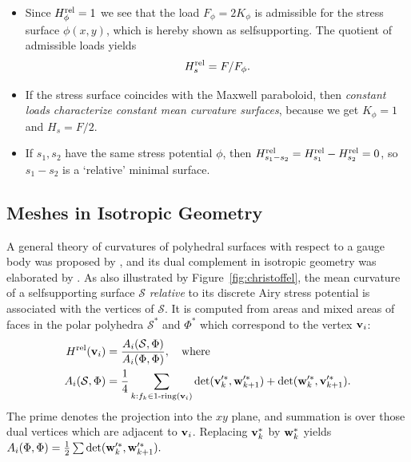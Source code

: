 \documentclass[annual]{acmsiggraph}
\def\rel{{\mathord{\text{\rm rel}}}}
\def\SS{{\mathcal S}}
\begin{document}
\begin{itemize}\itemsep-\parsep

\item Since $H^\rel_\phi=1$ we see that the load $F_\phi=2K_\phi$ is 
admissible for the stress surface $\phi(x,y)$, which is hereby shown as 
self\dash supporting. The quotient of admissible loads yields
	\begin{equation}
	 H_s^\rel = F/F_\phi. \label{equigeo2}
	\end{equation}

\item If the stress surface coincides with the Maxwell paraboloid, then 
{\em constant loads characterize constant mean curvature surfaces}, 
because we get $K_\phi=1$ and $H_s=F/2$.

\item If $s_1,s_2$ have the same stress potential $\phi$, then 
$H^\rel_{s_1-s_2}=H^\rel_{s_1}-H^\rel_{s_2}=0$, so $s_1-s_2$ is a 
`relative' minimal surface.

\end{itemize}



\subsection{Meshes in Isotropic Geometry} \label{sec:discrete}

A general theory of curvatures of polyhedral surfaces with respect to a 
gauge body was proposed by \cite{Pottmann2007b}, and its dual complement 
in isotropic geometry was elaborated by \cite{Pottmann2007}. As also 
illustrated by Figure~\ref{fig:christoffel}, the mean curvature of a 
self\dash supporting surface $\SS$ {\em relative} to its discrete Airy 
stress potential is associated with the vertices of $\SS$. It is computed 
from areas and mixed areas of faces in the polar polyhedra $\SS^*$ and 
$\Phi^*$ which correspond to the vertex ${\mathbf v}_i$:
	\begin{align*}
	H^\rel(\vw_i)
	&= {A_i(\SS,\Phi) \over A_i(\Phi,\Phi)}, 
	\quad\text{where}
	\\
		A_i (\SS,\Phi) 
	&= 
	\frac{1}{4}
		\sum_{k:f_k\in \text{1-ring}(\vw_i)}
		\det(\vw'^*_k, \ww'^*_{k+1}) 
		+ \det(\ww'^*_k, \vw'^*_{k+1}).
	\end{align*}
 The prime denotes the projection into the $xy$ plane, and summation is 
over those dual vertices which are adjacent to ${\mathbf v}_i$. 
Replacing ${\mathbf v}_k^*$ by ${\mathbf w}_k^*$ yields
	$
		A_i (\Phi,\Phi) 
	= 
	\frac{1}{2}
		\sum
		\det({\mathbf w}'^*_k, {\mathbf w}'^*_{k+1}).
	$
\end{document}
